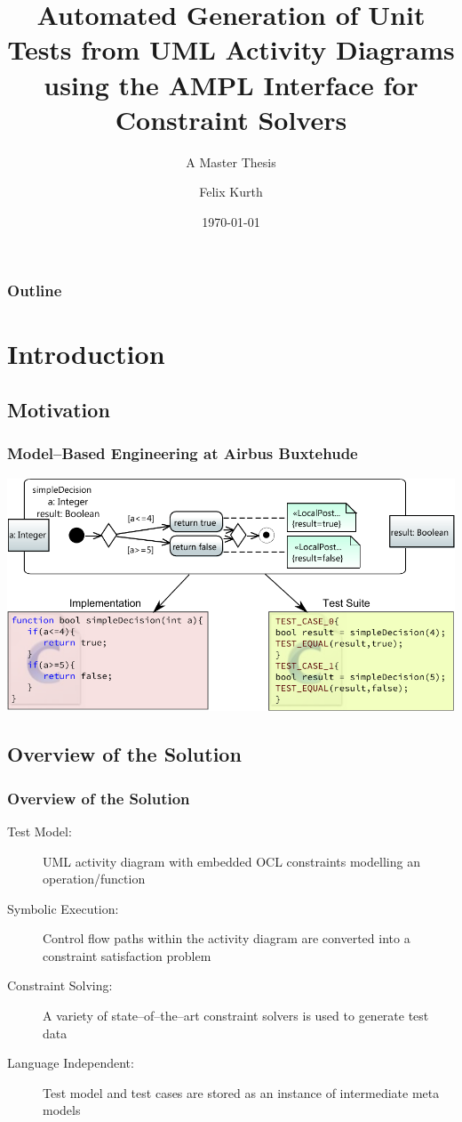 \documentclass{beamer}
\title[Automated Generation of Unit Tests]{Automated Generation of Unit Tests from UML Activity Diagrams using the AMPL Interface for Constraint Solvers}
\subtitle[M.Sc. Thesis]{A Master Thesis}
\author[F. Kurth]{Felix Kurth}
\date[Jan 2014]{\today}
\begin{document}
\begin{frame}
\titlepage
\end{frame}

\begin{frame}
\frametitle{Outline} 
\tableofcontents  
\end{frame}


\section{Introduction}
\subsection{Motivation}
\begin{frame}
\frametitle{Model--Based Engineering at Airbus Buxtehude}
\includegraphics[width=\textwidth]{../Thesis/pics/BasicExamplesSimpleDecision.pdf}
\end{frame}
\subsection{Overview of the Solution}
\begin{frame}
\frametitle{Overview of the Solution}
\begin{description}
\item[Test Model:] UML activity diagram with embedded OCL constraints modelling an operation/function
\item[Symbolic Execution:] Control flow paths within the activity diagram are converted into a constraint satisfaction problem
\item[Constraint Solving:] A variety of state--of--the--art constraint solvers is used to generate test data
\item[Language Independent:] Test model and test cases are stored as an instance of intermediate meta models
\end{description}
\end{frame}
\end{document}
